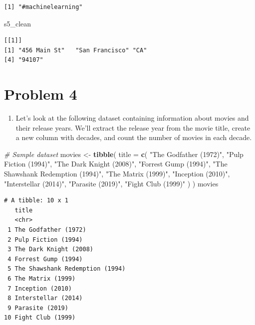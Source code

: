 \documentclass[
]{book}
\newenvironment{Shaded}{\begin{snugshade}}{\end{snugshade}}
\newcommand{\AttributeTok}[1]{\textcolor[rgb]{0.13,0.29,0.53}{#1}}
\newcommand{\CommentTok}[1]{\textcolor[rgb]{0.56,0.35,0.01}{\textit{#1}}}
\newcommand{\FunctionTok}[1]{\textcolor[rgb]{0.13,0.29,0.53}{\textbf{#1}}}
\newcommand{\NormalTok}[1]{#1}
\newcommand{\OtherTok}[1]{\textcolor[rgb]{0.56,0.35,0.01}{#1}}
\newcommand{\StringTok}[1]{\textcolor[rgb]{0.31,0.60,0.02}{#1}}
\providecommand{\tightlist}{%
  \setlength{\itemsep}{0pt}\setlength{\parskip}{0pt}}
\begin{document}
\begin{verbatim}
[1] "#machinelearning"
\end{verbatim}

\begin{Shaded}
\begin{Highlighting}[]
\NormalTok{s5\_clean}
\end{Highlighting}
\end{Shaded}

\begin{verbatim}
[[1]]
[1] "456 Main St"   "San Francisco" "CA"           
[4] "94107"        
\end{verbatim}

\hypertarget{problem-4}{%
\section{Problem 4}\label{problem-4}}

\begin{enumerate}
\def\labelenumi{\alph{enumi}.}
\tightlist
\item
  Let's look at the following dataset containing information about movies and their release years. We'll extract the release year from the movie title, create a new column with decades, and count the number of movies in each decade.
\end{enumerate}

\begin{Shaded}
\begin{Highlighting}[]
\CommentTok{\# Sample dataset}
\NormalTok{movies }\OtherTok{\textless{}{-}} \FunctionTok{tibble}\NormalTok{(}
  \AttributeTok{title =} \FunctionTok{c}\NormalTok{(}
    \StringTok{"The Godfather (1972)"}\NormalTok{, }\StringTok{"Pulp Fiction (1994)"}\NormalTok{, }\StringTok{"The Dark Knight (2008)"}\NormalTok{,}
    \StringTok{"Forrest Gump (1994)"}\NormalTok{, }\StringTok{"The Shawshank Redemption (1994)"}\NormalTok{, }\StringTok{"The Matrix (1999)"}\NormalTok{,}
    \StringTok{"Inception (2010)"}\NormalTok{, }\StringTok{"Interstellar (2014)"}\NormalTok{, }\StringTok{"Parasite (2019)"}\NormalTok{, }\StringTok{"Fight Club (1999)"}
\NormalTok{  )}
\NormalTok{)}
\NormalTok{movies}
\end{Highlighting}
\end{Shaded}

\begin{verbatim}
# A tibble: 10 x 1
   title                          
   <chr>                          
 1 The Godfather (1972)           
 2 Pulp Fiction (1994)            
 3 The Dark Knight (2008)         
 4 Forrest Gump (1994)            
 5 The Shawshank Redemption (1994)
 6 The Matrix (1999)              
 7 Inception (2010)               
 8 Interstellar (2014)            
 9 Parasite (2019)                
10 Fight Club (1999)              
\end{verbatim}
\end{document}
